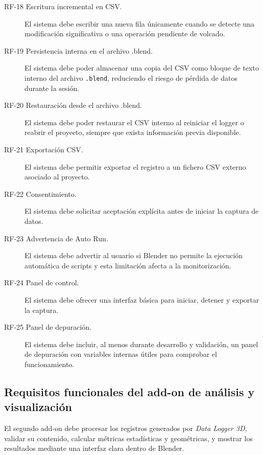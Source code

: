 \begin{description}
    \item[RF-18 Escritura incremental en CSV.] El sistema debe escribir una nueva fila únicamente cuando se detecte una modificación significativa o una operación pendiente de volcado.

    \item[RF-19 Persistencia interna en el archivo .blend.] El sistema debe poder almacenar una copia del CSV como bloque de texto interno del archivo \texttt{.blend}, reduciendo el riesgo de pérdida de datos durante la sesión.

    \item[RF-20 Restauración desde el archivo .blend.] El sistema debe poder restaurar el CSV interno al reiniciar el logger o reabrir el proyecto, siempre que exista información previa disponible.

    \item[RF-21 Exportación CSV.] El sistema debe permitir exportar el registro a un fichero CSV externo asociado al proyecto.

    \item[RF-22 Consentimiento.] El sistema debe solicitar aceptación explícita antes de iniciar la captura de datos.

    \item[RF-23 Advertencia de Auto Run.] El sistema debe advertir al usuario si Blender no permite la ejecución automática de scripts y esta limitación afecta a la monitorización.

    \item[RF-24 Panel de control.] El sistema debe ofrecer una interfaz básica para iniciar, detener y exportar la captura.

    \item[RF-25 Panel de depuración.] El sistema debe incluir, al menos durante desarrollo y validación, un panel de depuración con variables internas útiles para comprobar el funcionamiento.
\end{description}

\subsection{Requisitos funcionales del add-on de análisis y visualización}

El segundo add-on debe procesar los registros generados por \textit{Data Logger 3D}, validar su contenido, calcular métricas estadísticas y geométricas, y mostrar los resultados mediante una interfaz clara dentro de Blender.

